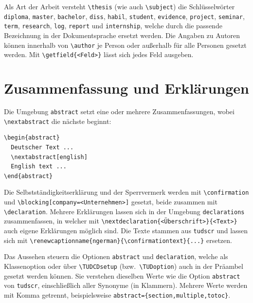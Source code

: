 \documentclass[
  logo={
    color=blue,
    language=de,
    colormodel=rgb
  },
  fontsize=11tudpt,
  usemargin,
  oneside
]{tudcdreprt}
\begin{document}
Als Art der Arbeit versteht \texttt{\textbackslash thesis} (wie auch \texttt{\textbackslash subject})
die Schlüsselwörter \texttt{diploma}, \texttt{master}, \texttt{bachelor}, \texttt{diss}, \texttt{habil},
\texttt{student}, \texttt{evidence}, \texttt{project}, \texttt{seminar}, \texttt{term}, \texttt{research},
\texttt{log}, \texttt{report} und \texttt{internship}, welche durch die passende Bezeichnung in der Dokumentsprache
ersetzt werden.
Die Angaben zu Autoren können innerhalb von \texttt{\textbackslash author} je Person oder außerhalb für alle
Personen gesetzt werden.
Mit \texttt{\textbackslash getfield\{<Feld>\}} lässt sich jedes Feld ausgeben.

\section{Zusammenfassung und Erklärungen}

Die Umgebung \texttt{abstract} setzt eine oder mehrere Zusammenfassungen, wobei \texttt{\textbackslash nextabstract}
die nächste beginnt:
\begin{lstlisting}
\begin{abstract}
  Deutscher Text ...
  \nextabstract[english]
  English text ...
\end{abstract}
\end{lstlisting}
Die Selbstständigkeitserklärung und der Sperrvermerk werden mit \texttt{\textbackslash confirmation} und
\texttt{\textbackslash blocking[company=<Unternehmen>]} gesetzt, beide zusammen mit \texttt{\textbackslash declaration}.
Mehrere Erklärungen lassen sich in der Umgebung \texttt{declarations} zusammenfassen, in welcher mit
\texttt{\textbackslash nextdeclaration\{<Überschrift>\}\{<Text>\}} auch eigene Erklärungen möglich sind.
Die Texte stammen aus \texttt{tudscr} und lassen sich mit
\texttt{\textbackslash renewcaptionname\{ngerman\}\{\textbackslash confirmationtext\}\{...\}} ersetzen.

Das Aussehen steuern die Optionen \texttt{abstract} und \texttt{declaration}, welche als Klassenoption oder über
\texttt{\textbackslash TUDCDsetup} (bzw.\ \texttt{\textbackslash TUDoption}) auch in der Präambel gesetzt werden können.
Sie verstehen dieselben Werte wie die Option \texttt{abstract} von \texttt{tudscr}, einschließlich aller Synonyme
(in Klammern). Mehrere Werte werden mit Komma getrennt, beispielsweise \texttt{abstract=\{section,multiple,totoc\}}.
\end{document}
